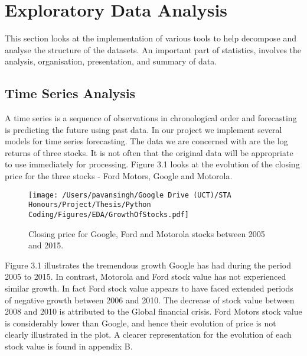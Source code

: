 
\chapter{Exploratory Data Analysis} %

\label{Chapter3} %

This section looks at the implementation of various tools to help decompose and analyse the structure of the datasets. An important part of statistics, involves the analysis, organisation, presentation, and summary of data. 


\section{Time Series Analysis}

A time series is a sequence of observations in chronological order and forecasting is predicting the future using past data.  In our project we implement several models for time series forecasting. The data we are concerned with are the log returns of three stocks. It is not often that the original data will be appropriate to use immediately for processing. Figure 3.1 looks at the evolution of the closing price for the three stocks - Ford Motors, Google and Motorola. 

\begin{figure}[h]
\centering
  \texttt{[image: /Users/pavansingh/Google Drive (UCT)/STA Honours/Project/Thesis/Python Coding/Figures/EDA/GrowthOfStocks.pdf]}
  \caption{Closing price for Google, Ford and Motorola stocks between 2005 and 2015.}
  \label{}
\end{figure}

Figure 3.1 illustrates the tremendous growth Google has had during the period 2005 to 2015. In contrast, Motorola and Ford stock value has not experienced similar growth. In fact Ford stock value appears to have faced extended periods of negative growth between 2006 and 2010. The decrease of stock value between 2008 and 2010 is attributed to the Global financial crisis. Ford Motors stock value is considerably lower than Google, and hence their evolution of price is not clearly illustrated in the plot. A clearer representation for the evolution of each stock value is found in appendix B. 

